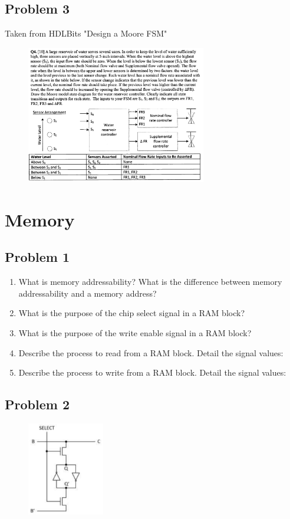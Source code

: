 \documentclass{article}
\begin{document}
\newpage
\subsection*{Problem 3}
Taken from HDLBits "Design a Moore FSM"\\
\begin{figure}[!h]
    \centering
    \includegraphics[width=0.7\textwidth]{figures/fsm_q3.png}
\end{figure}


\newpage
\section*{Memory}
\subsection*{Problem 1}

\begin{enumerate}[label=\alph*.]
\item What is memory addressability? What is the difference between memory addressability and a memory address?
\item What is the purpose of the chip select signal in a RAM block?
\item What is the purpose of the write enable signal in a RAM block?
\item Describe the process to read from a RAM block. Detail the signal values:
\item Describe the process to write from a RAM block. Detail the signal values:

\end{enumerate}

\subsection*{Problem 2}
\begin{figure}[!h]
    \centering
    \includegraphics[width=0.3\textwidth]{figures/memory_q2.png}
\end{figure}
\end{document}
